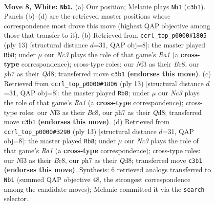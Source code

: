 \documentclass[11pt]{article}
\begin{document}
\begin{figure}[p]\centering
\begin{subfigure}{0.46\textwidth}\centering
\resizebox{\linewidth}{!}{%
\newchessgame
\chessboard[
  setfen={1rbq1rk1/pp1pppbp/2n2np1/2p5/2P4P/2N2NP1/PP1PPPB1/R1BQ1RK1 w - - 1 8},
  showmover=false,
  pgfstyle=straightmove, color=movearrow, markmove={c3-b1}
]}
\caption{}
\end{subfigure}\hfill
\begin{subfigure}{0.46\textwidth}\centering
\resizebox{\linewidth}{!}{%
\newchessgame
\chessboard[
  setfen={r1bq1rk1/1pppppbp/p1n2np1/8/2PP4/2N2NP1/PP2PPBP/R1BQ1RK1 b - - 0 7},
  showmover=false,
  pgfstyle=straightmove, color=movearrow, markmove={a8-b8}
]}
\caption{}
\end{subfigure}
\\[4pt]
\begin{subfigure}{0.46\textwidth}\centering
\resizebox{\linewidth}{!}{%
\newchessgame
\chessboard[
  setfen={r1bq1rk1/1pppppbp/p1n2np1/8/2PP4/2N2NP1/PP2PPBP/R1BQ1RK1 b - - 0 7},
  showmover=false,
  pgfstyle=straightmove, color=movearrow, markmove={a8-b8}
]}
\caption{}
\end{subfigure}\hfill
\begin{subfigure}{0.46\textwidth}\centering
\resizebox{\linewidth}{!}{%
\newchessgame
\chessboard[
  setfen={r1bq1rk1/1pppppbp/p1n2np1/8/2PP4/2N2NP1/PP2PPBP/R1BQ1RK1 b - - 0 7},
  showmover=false,
  pgfstyle=straightmove, color=movearrow, markmove={a8-b8}
]}
\caption{}
\end{subfigure}
\caption{\textbf{Move 8, White: \texttt{Nb1}.} (a) Our position; Melanie plays \texttt{Nb1} (\texttt{c3b1}). Panels (b)--(d) are the retrieved master positions whose correspondence most drove this move (highest QAP objective among those that transfer to it). (b) Retrieved from \texttt{ccrl\_top\_p0000\#1805} (ply 13) [structural distance $d$=31, QAP obj=8]: the master played \texttt{Rb8}; under $\mu$ our \emph{Nc3} plays the role of that game's \emph{Ra1} (a \textbf{cross-type} correspondence); cross-type roles: our \emph{N}f3 as their \emph{B}c8, our \emph{p}h7 as their \emph{Q}d8; transferred move \texttt{c3b1} \textbf{(endorses this move)}. (c) Retrieved from \texttt{ccrl\_top\_p0000\#1806} (ply 13) [structural distance $d$=31, QAP obj=8]: the master played \texttt{Rb8}; under $\mu$ our \emph{Nc3} plays the role of that game's \emph{Ra1} (a \textbf{cross-type} correspondence); cross-type roles: our \emph{N}f3 as their \emph{B}c8, our \emph{p}h7 as their \emph{Q}d8; transferred move \texttt{c3b1} \textbf{(endorses this move)}. (d) Retrieved from \texttt{ccrl\_top\_p0000\#3290} (ply 13) [structural distance $d$=31, QAP obj=8]: the master played \texttt{Rb8}; under $\mu$ our \emph{Nc3} plays the role of that game's \emph{Ra1} (a \textbf{cross-type} correspondence); cross-type roles: our \emph{N}f3 as their \emph{B}c8, our \emph{p}h7 as their \emph{Q}d8; transferred move \texttt{c3b1} \textbf{(endorses this move)}. Synthesis: 6 retrieved analogs transferred to \texttt{Nb1} (summed QAP objective 48, the strongest correspondence among the candidate moves); Melanie committed it via the \texttt{search} selector.}
\label{fig:thought-m14}
\end{figure}
\end{document}
